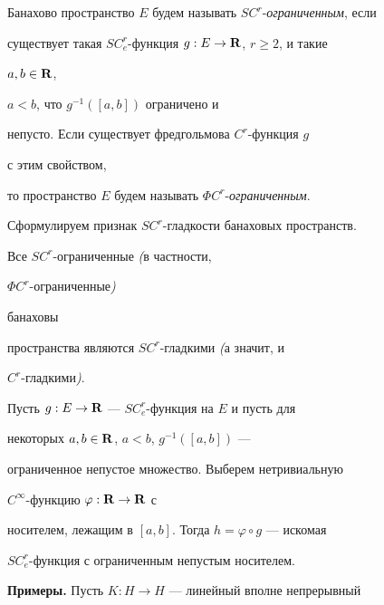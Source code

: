 \begin{defns}


Банахово пространство $E$ будем называть $SC^r$-{\em ограниченным}, если


существует такая $SC^r_e$-функция $g:E\to\bold R$, $r\ge 2$, и такие


$a,b\in\bold R$,


$a<b$, что $g^{-1}([a,b])$ ограничено и


непусто. Если существует фредгольмова $C^r$-функция $g$


с этим свойством,


то пространство $E$ будем называть $\Phi C^r$-{\em ограниченным}.


\end{defns}





Сформулируем признак $SC^r$-гладкости банаховых пространств.





\begin{thms}


Все $SC^r$-ограниченные {\em (}в частности,


$\Phi C^r$-ограниченные{\em )}


банаховы


пространства являются $SC^r$-гладкими {\em (}а значит, и


$C^r$-гладкими{\em )}.


\end{thms}





\begin{pf}


Пусть $g:E\to\bold R$ --- $SC^r_e$-функция на $E$ и пусть для


некоторых $a,b\in\bold R$, $a<b$, $g^{-1}([a,b])$ ---


ограниченное непустое множество. Выберем нетривиальную


$C^\infty$-функцию $\varphi:\bold R\to\bold R$ с


носителем, лежащим в $[a,b]$. Тогда $h=\varphi\circ g$ --- искомая


$SC^r_e$-функция с ограниченным непустым носителем.


\end{pf}





{\bf Примеры.} Пусть $K:H\to H$ --- линейный вполне непрерывный


